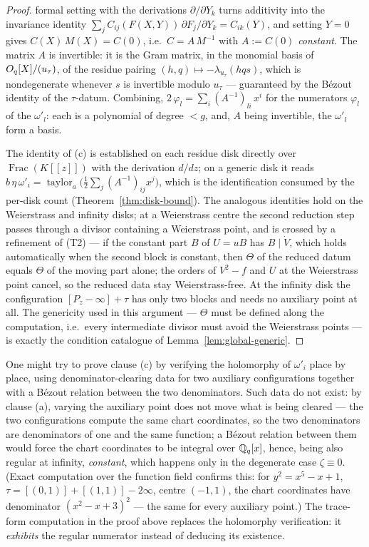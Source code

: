 \begin{proof}
formal setting with the derivations $\partial/\partial Y_k$ turns additivity into the
invariance identity $\sum_j C_{ij}(F(X,Y))\,\partial F_j/\partial Y_k = C_{ik}(Y)$, and
setting $Y = 0$ gives $C(X)\,M(X) = C(0)$, i.e.\ $C = A\,M^{-1}$ with $A := C(0)$
\emph{constant}. The matrix $A$ is invertible: it is the Gram matrix, in the monomial
basis of $O_q[X]/(u_\tau)$, of the residue pairing $(h,q) \mapsto -\lambda_{u_\tau}(hqs)$,
which is nondegenerate whenever $s$ is invertible modulo $u_\tau$ --- guaranteed by the
B\'ezout identity of the $\tau$-datum. Combining, $2\,\varphi_l = \sum_i
(A^{-1})_{li}\,x^i$ for the numerators $\varphi_l$ of the $\omega'_l$: each is a
polynomial of degree $< g$, and, $A$ being invertible, the $\omega'_l$ form a basis.

The identity of (c) is established on each residue disk directly over
$\operatorname{Frac}(K[[z]])$ with the derivation $d/dz$; on a generic disk it reads
$b\,\eta\,\omega'_i = \operatorname{taylor}_a\bigl(\tfrac12\sum_j (A^{-1})_{ij}
x^j\bigr)$, which is the identification consumed by the per-disk count
(Theorem~\ref{thm:disk-bound}). The analogous identities hold on the Weierstrass and
infinity disks; at a Weierstrass centre the second reduction step passes through a
divisor containing a Weierstrass point, and is crossed by a refinement of (T2) --- if
the constant part $B$ of $U = uB$ has $B \mid \dot V$, which holds automatically when
the second block is constant, then $\Theta$ of the reduced datum equals $\Theta$ of the
moving part alone; the orders of $V^2 - f$ and $U$ at the Weierstrass point cancel, so
the reduced data stay Weierstrass-free. At the infinity disk the configuration
$[P_z - \infty] + \tau$ has only two blocks and needs no auxiliary point at all. The
genericity used in this argument --- $\Theta$ must be defined along the computation,
i.e.\ every intermediate divisor must avoid the Weierstrass points --- is exactly the
condition catalogue of Lemma~\ref{lem:global-generic}.
\end{proof}

\begin{remark}
One might try to prove clause (c) by verifying the holomorphy of $\omega'_i$ place by
place, using denominator-clearing data for two auxiliary configurations together with a
B\'ezout relation between the two denominators. Such data do not exist: by clause (a),
varying the auxiliary point does not move what is being cleared --- the two configurations
compute the same chart coordinates, so the two denominators are denominators of one and the
same function; a B\'ezout relation between them would force the chart coordinates to be
integral over $\mathbb{Q}_q[x]$, hence, being also regular at infinity, \emph{constant}, which
happens only in the degenerate case $\zeta \equiv 0$. (Exact computation over the
function field confirms this: for $y^2 = x^5-x+1$, $\tau = [(0,1)]+[(1,1)]-2\infty$,
centre $(-1,1)$, the chart coordinates have denominator $(x^2-x+3)^2$ --- the same for
every auxiliary point.) The trace-form computation in the proof above replaces the
holomorphy verification: it \emph{exhibits} the regular numerator instead of deducing
its existence.
\end{remark}

